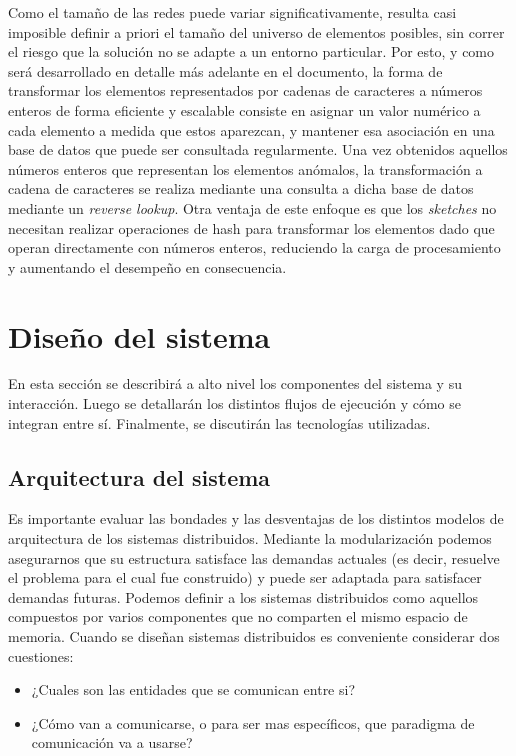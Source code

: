 \documentclass[a4paper,10pt, oneside]{article}
\begin{document}
Como el tamaño de las redes puede variar significativamente, resulta casi imposible definir a priori el tamaño del universo de elementos posibles, sin correr el riesgo que la solución no se adapte a un entorno particular. Por esto, y como será desarrollado en detalle más adelante en el documento, la forma de transformar los elementos representados por cadenas de caracteres a números enteros de forma eficiente y escalable consiste en asignar un valor numérico a cada elemento a medida que estos aparezcan, y mantener esa asociación en una base de datos que puede ser consultada regularmente. Una vez obtenidos aquellos números enteros que representan los elementos anómalos, la transformación a cadena de caracteres se realiza mediante una consulta a dicha base de datos mediante un \textit{reverse lookup}. Otra ventaja de este enfoque es que los \textit{sketches} no necesitan realizar operaciones de hash para transformar los elementos dado que operan directamente con números enteros, reduciendo la carga de procesamiento y aumentando el desempeño en consecuencia.

\newpage

\section{Diseño del sistema}
En esta sección se describirá a alto nivel los componentes del sistema y su interacción. Luego se detallarán los distintos flujos de ejecución y cómo se integran entre sí. Finalmente, se discutirán las tecnologías utilizadas.

\subsection{Arquitectura del sistema}

Es importante evaluar las bondades y las desventajas de los distintos modelos de arquitectura de los sistemas distribuidos. Mediante la modularización podemos asegurarnos que su estructura satisface las demandas actuales (es decir, resuelve el problema para el cual fue construido) y puede ser adaptada para satisfacer demandas futuras.
Podemos definir a los sistemas distribuidos como aquellos compuestos por varios componentes que no comparten el mismo espacio de memoria\cite{Muhl:2006:DES:1162246}. Cuando se diseñan sistemas distribuidos es conveniente considerar dos cuestiones: 

\begin{itemize}
	\item ¿Cuales son las entidades que se comunican entre si?
	\item ¿Cómo van a comunicarse, o para ser mas específicos, que paradigma de comunicación va a usarse?
\end{itemize}
\end{document}

